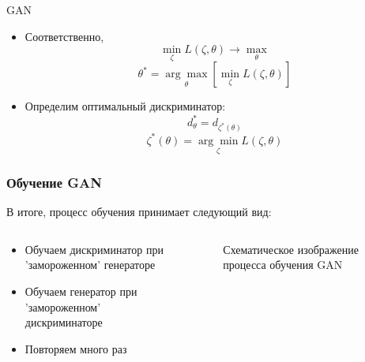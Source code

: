 \documentclass[9pt]{beamer}
\begin{document}
\begin{frame}{GAN}
	\begin{itemize}
		\item Соответственно,
		 $$ \underset{\zeta}{\min} L(\zeta, \theta) \longrightarrow \underset{\theta}{\max} $$
		 $$ \theta^* = \underset{\theta}{\arg\max} \left[ \underset{\zeta}{\min} L(\zeta, \theta) \right] $$
		 \item Определим оптимальный дискриминатор:
		 $$ d^*_{\theta} = d_{\zeta^*(\theta)} $$
		 $$ \zeta^*(\theta) =  \underset{\zeta}{\arg\min} L(\zeta, \theta)$$
	\end{itemize}
\end{frame}

\begin{frame}\frametitle{Обучение GAN}
	В итоге, процесс обучения принимает следующий вид:
	\begin{columns}
			\begin{center}
				\begin{itemize}
					\item Обучаем дискриминатор при 'замороженном' генераторе
					\item Обучаем генератор при 'замороженном' дискриминаторе
					\item Повторяем много раз
				\end{itemize}
			\end{center}
			\begin{figure}
				\caption{Схематическое изображение процесса обучения GAN}
			\end{figure}
	\end{columns}
\end{frame}
\end{document}
